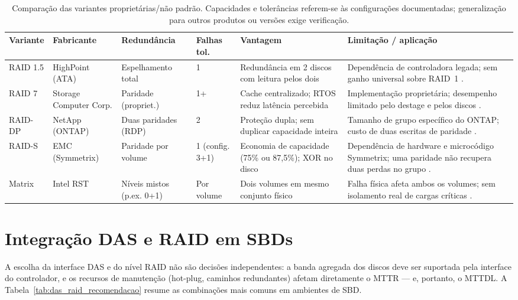 \documentclass[titlepage]{article}
\begin{document}
\begin{table}[htbp]
\centering\footnotesize
\begin{tabularx}{\textwidth}{p{}p{}p{}p{}XX}
\toprule
Variante & Fabricante & Redundância & Falhas tol. & Vantagem & Limitação / aplicação \\
\midrule
RAID 1.5 & HighPoint (ATA) & Espelhamento total & 1 & Redundância em 2 discos com leitura pelos dois & Dependência de controladora legada; sem ganho universal sobre RAID~1 \cite{highpoint_15}. \\
RAID 7 & Storage Computer Corp. & Paridade (propriet.) & 1+ & Cache centralizado; RTOS reduz latência percebida & Implementação proprietária; desempenho limitado pelo destage e pelos discos \cite{storagecomputer_7}. \\
RAID-DP & NetApp (ONTAP) & Duas paridades (RDP) & 2 & Proteção dupla; sem duplicar capacidade inteira & Tamanho de grupo específico do ONTAP; custo de duas escritas de paridade \cite{corbett2004,netapp_raid_dp}. \\
RAID-S & EMC (Symmetrix) & Paridade por volume & 1 (config. 3+1) & Economia de capacidade (75\% ou 87,5\%); XOR no disco & Dependência de hardware e microcódigo Symmetrix; uma paridade não recupera duas perdas no grupo \cite{raid_s_nasa}. \\
Matrix & Intel RST & Níveis mistos (p.ex. 0+1) & Por volume & Dois volumes em mesmo conjunto físico & Falha física afeta ambos os volumes; sem isolamento real de cargas críticas \cite{intel_matrix}. \\
\bottomrule
\end{tabularx}
\caption{Comparação das variantes proprietárias/não padrão. Capacidades e tolerâncias referem-se às configurações documentadas; generalização para outros produtos ou versões exige verificação.}
\label{tab:raid_nao_padrao}
\end{table}

\section{Integração DAS e RAID em SBDs}
\label{sec:das_raid_integracao}
A escolha da interface DAS e do nível RAID não são decisões independentes: a banda agregada dos discos deve ser suportada pela interface do controlador, e os recursos de manutenção (hot-plug, caminhos redundantes) afetam diretamente o MTTR --- e, portanto, o MTTDL. A Tabela~\ref{tab:das_raid_recomendacao} resume as combinações mais comuns em ambientes de SBD.
\end{document}
